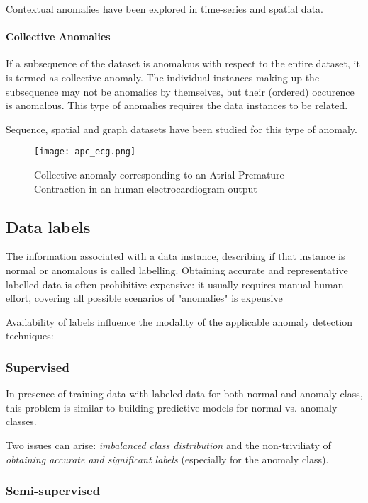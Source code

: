 Contextual anomalies have been explored in time-series and spatial data.

\paragraph{Collective Anomalies} If a subsequence of the dataset is anomalous with respect to the entire dataset, it is termed as collective anomaly. The individual instances making up the subsequence may not be anomalies by themselves, but their (ordered) occurence is anomalous. This type of anomalies requires the data instances to be related.

Sequence, spatial and graph datasets have been studied for this type of anomaly.

\begin{figure}
	\centerline{
		\texttt{[image: apc\_ecg.png]}}
	\caption{ Collective anomaly corresponding to an Atrial Premature Contraction in an human electrocardiogram output \cite{Goldberger2000PhysioBankPA} \cite{chandola2009anomaly}}
	\label{fig:apc_ecg}
\end{figure}


\subsection{Data labels}

The information associated with a data instance, describing if that instance is normal or anomalous is called labelling. Obtaining accurate and representative labelled data is often prohibitive expensive: it usually requires manual human effort, covering all possible scenarios of "anomalies" is expensive

Availability of labels influence the modality of the applicable anomaly detection techniques:

\subsubsection{Supervised}

In presence of training data with labeled data for both normal and anomaly class, this problem is similar to building predictive models for normal vs. anomaly classes.

Two issues can arise: \textit{imbalanced class distribution} and the non-triviliaty of \textit{obtaining accurate and significant labels} (especially for the anomaly class).


\subsubsection{Semi-supervised}

